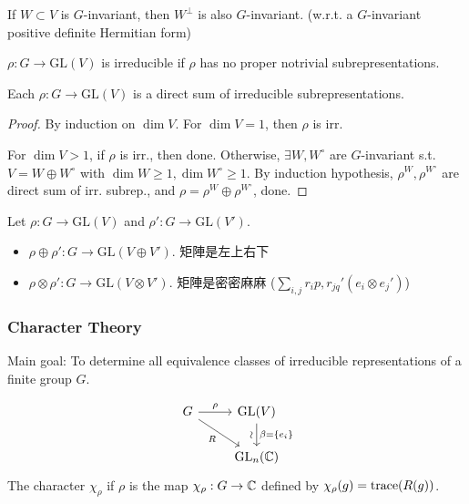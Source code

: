 \begin{remark}
  If $W \subset V$ is $G$-invariant, then $W^\perp$ is also $G$-invariant.
  (w.r.t. a $G$-invariant positive definite Hermitian form)
\end{remark}

\begin{definition}
  $\rho: G \to \text{GL}(V)$ is irreducible if $\rho$ has no proper notrivial
  subrepresentations.
\end{definition}

\begin{theorem}
  Each $\rho: G\to \text{GL}(V)$ is a direct sum of irreducible
  subrepresentations.
  \begin{proof}
    By induction on $\dim V$. For $\dim V = 1$, then $\rho$ is irr.

    For $\dim V > 1$, if $\rho$ is irr., then done.
    Otherwise, $\exists W, W^\circ$ are $G$-invariant s.t.
    $V = W \oplus W^\circ$ with $\dim W \ge 1, \dim W^\circ \ge 1$.
    By induction hypothesis, $\rho^W, \rho^{W^\circ}$ are direct sum
    of irr. subrep., and $\rho = \rho^W \oplus \rho^{W^\circ}$, done.
  \end{proof}
\end{theorem}

\begin{remark}
  Let $\rho: G \to \text{GL}(V)$ and $\rho': G \to \text{GL}(V')$.
  \begin{itemize}
    \item $\rho \oplus \rho': G \to \text{GL}(V\oplus V')$.
      矩陣是左上右下
    \item $\rho \otimes \rho': G \to \text{GL}(V\otimes V')$.
      矩陣是密密麻麻 ($\sum_{i,j} r_ip, r_{jq}' (e_i \otimes e_j')$)
  \end{itemize}
\end{remark}

\subsubsection{Character Theory }

Main goal: To determine all equivalence classes of irreducible representations
of a finite group $G$.

\begin{definition}
  \[
    \begin{tikzcd}
      G \arrow{r}{\rho} \arrow[swap]{dr}{R}
      & \text{GL}(V) \arrow[d, "\beta=\{e_i\}", "\rotatebox{90}{\(\sim\)}"'] \\
      & \text{GL}_n(\Cb)
    \end{tikzcd}
  \]
  The character $\chi_\rho$ if $\rho$ is the map
  $\chi_\rho: G\to \mathbb{C}$ defined by $\chi_\rho(g) = \operatorname{trace}(R(g))$.
\end{definition}


